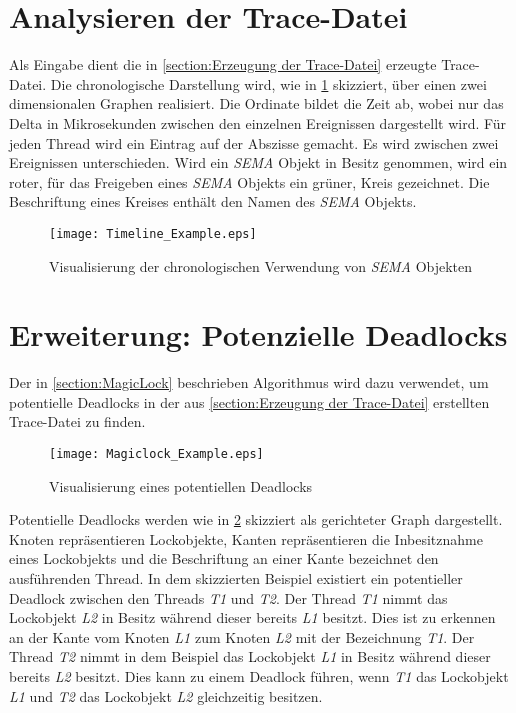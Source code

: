 \section{Analysieren der Trace-Datei}
\label{section:Analysieren der Trace-Datei}
Als Eingabe dient die in \cref{section:Erzeugung der Trace-Datei} erzeugte
Trace-Datei. Die chronologische Darstellung wird, wie in
\cref{fig:Timeline_Example} skizziert, über einen zwei dimensionalen Graphen
realisiert. Die Ordinate bildet die Zeit ab, wobei nur das Delta in
Mikrosekunden zwischen den einzelnen Ereignissen dargestellt wird. Für jeden
Thread wird ein Eintrag auf der Abszisse gemacht. Es wird zwischen zwei
Ereignissen unterschieden. Wird ein \emph{SEMA} Objekt in Besitz genommen, wird
ein roter, für das Freigeben eines \emph{SEMA} Objekts ein grüner, Kreis
gezeichnet. Die Beschriftung eines Kreises enthält den Namen des \emph{SEMA}
Objekts.
\begin{figure}[ht]
  \texttt{[image: Timeline\_Example.eps]}
  \caption{Visualisierung der chronologischen Verwendung von \emph{SEMA} Objekten}
  \label{fig:Timeline_Example}
\end{figure}

\section{Erweiterung: Potenzielle Deadlocks}
\label{section:Erweiterung: Potenzielle Deadlocks}
Der in \cref{section:MagicLock} beschrieben Algorithmus wird dazu verwendet, um
potentielle Deadlocks in der aus \cref{section:Erzeugung der Trace-Datei}
erstellten Trace-Datei zu finden. 
\begin{figure}[ht]
  \texttt{[image: Magiclock\_Example.eps]}
  \caption{Visualisierung eines potentiellen Deadlocks}
  \label{fig:Magiclock_Example}
\end{figure}

Potentielle Deadlocks werden wie in \cref{fig:Magiclock_Example} skizziert als
gerichteter Graph dargestellt. Knoten repräsentieren Lockobjekte, Kanten
repräsentieren die Inbesitznahme eines Lockobjekts und die Beschriftung an einer
Kante bezeichnet den ausführenden Thread. In dem skizzierten Beispiel existiert
ein potentieller Deadlock zwischen den Threads \emph{T1} und \emph{T2}. Der
Thread \emph{T1} nimmt das Lockobjekt \emph{L2} in Besitz während dieser bereits
\emph{L1} besitzt. Dies ist zu erkennen an der Kante vom Knoten \emph{L1} zum
Knoten \emph{L2} mit der Bezeichnung \emph{T1}. Der Thread \emph{T2} nimmt in
dem Beispiel das Lockobjekt \emph{L1} in Besitz während dieser bereits \emph{L2}
besitzt. Dies kann zu einem Deadlock führen, wenn \emph{T1} das Lockobjekt
\emph{L1} und \emph{T2} das Lockobjekt \emph{L2} gleichzeitig besitzen.